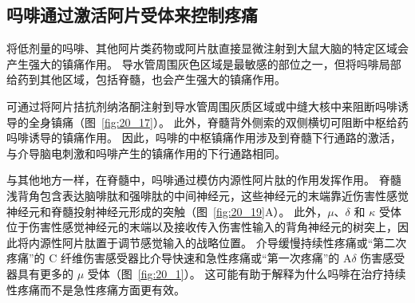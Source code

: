 \subsection{吗啡通过激活阿片受体来控制疼痛}

将低剂量的吗啡、其他阿片类药物或阿片肽直接显微注射到大鼠大脑的特定区域会产生强大的镇痛作用。
导水管周围灰色区域是最敏感的部位之一，但将吗啡局部给药到其他区域，包括脊髓，也会产生强大的镇痛作用。


可通过将阿片拮抗剂纳洛酮注射到导水管周围灰质区域或中缝大核中来阻断吗啡诱导的全身镇痛（图~\ref{fig:20_17}）。
此外，脊髓背外侧索的双侧横切可阻断中枢给药吗啡诱导的镇痛作用。
因此，吗啡的中枢镇痛作用涉及到脊髓下行通路的激活，与介导脑电刺激和吗啡产生的镇痛作用的下行通路相同。


与其他地方一样，在脊髓中，吗啡通过模仿内源性阿片肽的作用发挥作用。
脊髓浅背角包含表达脑啡肽和强啡肽的中间神经元，这些神经元的末端靠近伤害性感觉神经元和脊髓投射神经元形成的突触（图~\ref{fig:20_19}A）。
此外，$\mu$、$\delta$ 和 $ \kappa $ 受体位于伤害性感觉神经元的末端以及接收传入伤害性输入的背角神经元的树突上，因此将内源性阿片肽置于调节感觉输入的战略位置。
介导缓慢持续性疼痛或“第二次疼痛”的 C 纤维伤害感受器比介导快速和急性疼痛或“第一次疼痛”的 A$\delta$ 伤害感受器具有更多的 $\mu$ 受体（图~\ref{fig:20_1}）。
这可能有助于解释为什么吗啡在治疗持续性疼痛而不是急性疼痛方面更有效。


